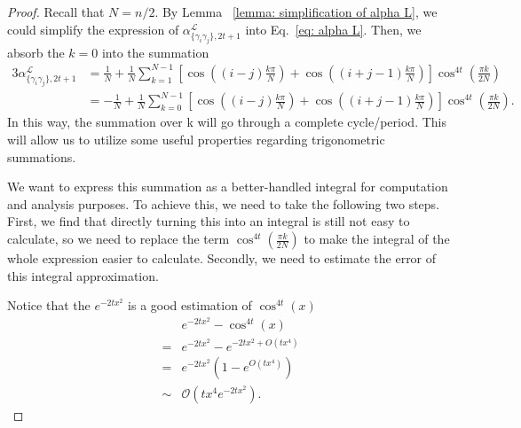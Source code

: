 \documentclass{article}
\newcommand{\alpl}{\alpha_{\{\gamma_i\gamma_j\}, 2t+1}^{\mathscr{L}}}
\begin{document}
\begin{proof}
Recall that $N = n/2$.
By Lemma ~\ref{lemma: simplification of alpha L}, we could simplify the expression of $\alpl$ into Eq.~\eqref{eq: alpha L}. Then, we absorb the $k=0$ into the summation
\begin{equation}
\label{eq: zz anonymous 13}
\begin{aligned}
3\alpl & =\frac{1}{N}+\frac{1}{N} \sum_{k=1}^{N-1}\left[\cos \left((i-j) \frac{k \pi}{N}\right)+\cos \left((i+j-1) \frac{k \pi}{N}\right)\right] \cos ^{4 t}\left(\frac{\pi k}{2 N}\right) \\
& =-\frac{1}{N}+\frac{1}{N} \sum_{k=0}^{N-1}\left[\cos \left((i-j) \frac{k \pi}{N}\right)+\cos \left((i+j-1) \frac{k \pi}{N}\right)\right] \cos ^{4 t}\left(\frac{\pi k}{2 N}\right).
\end{aligned}
\end{equation}
In this way, the summation over k will go through a complete cycle/period. This will allow us to utilize some useful properties regarding trigonometric summations.

We want to express this summation as a better-handled integral for computation and analysis purposes. To achieve this, we need to take the following two steps. First, we find that directly turning this into an integral is still not easy to calculate, so we need to replace the term $\cos ^{4 t}\left(\frac{\pi k}{2 N}\right)$ to make the integral of the whole expression easier to calculate. Secondly, we need to estimate the error of this integral approximation.

Notice that the $e^{-2tx^2}$ is a good estimation of $\cos ^{4 t}\left(x\right)$
\begin{equation}
\begin{aligned}
& e^{-2 t x^2}-\cos ^{4 t}(x) \\
= & e^{-2 t x^2}-e^{-2 t x^2+O\left(t x^4\right)} \\
= & e^{-2 t x^2}\left(1-e^{O\left(t x^4\right)}\right) \\
\sim & \mathcal{O}\left(t x^4 e^{-2 t x^2}\right).
\end{aligned}
\end{equation}


\end{proof}
\end{document}
